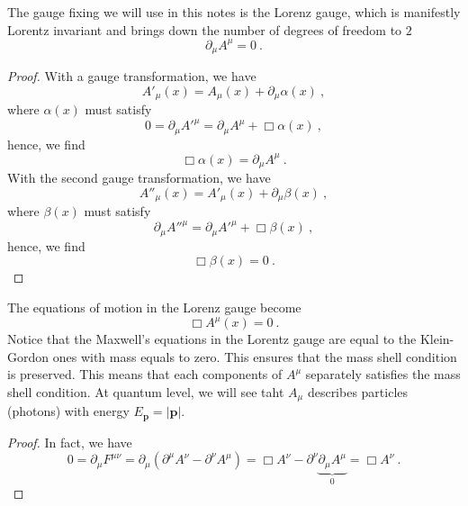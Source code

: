     The gauge fixing we will use in this notes is the Lorenz gauge, which is manifestly Lorentz invariant and brings down the number of degrees of freedom to $2$
    \begin{equation*}
        \partial_\mu A^\mu = 0 ~.
    \end{equation*}
    \begin{proof}
        With a gauge transformation, we have
        \begin{equation*}
            {A'}_\mu (x) = A_\mu (x) + \partial_\mu \alpha (x) ~,
        \end{equation*}
        where $\alpha (x)$ must satisfy 
        \begin{equation*}
            0 = \partial_\mu {A'}^\mu = \partial_\mu A^\mu + \Box \alpha (x) ~,
        \end{equation*}
        hence, we find
        \begin{equation*}
            \Box \alpha(x) = \partial_\mu A^\mu ~.
        \end{equation*}
        With the second gauge transformation, we have
        \begin{equation*}
            {A''}_\mu (x) = {A'}_\mu (x) + \partial_\mu \beta (x) ~,
        \end{equation*}
        where $\beta (x)$ must satisfy 
        \begin{equation*}
            \partial_\mu {A''}^\mu = \partial_\mu {A'}^\mu + \Box \beta (x) ~,
        \end{equation*}
        hence, we find
        \begin{equation*}
            \Box \beta(x) = 0 ~.
        \end{equation*}
    \end{proof}
    The equations of motion in the Lorenz gauge become 
    \begin{equation}\label{lgem}
        \Box A^\mu (x) = 0 ~.
    \end{equation}
    Notice that the Maxwell's equations in the Lorentz gauge are equal to the Klein-Gordon ones with mass equals to zero. This ensures that the mass shell condition is preserved. This means that each components of $A^\mu$ separately satisfies the mass shell condition. At quantum level, we will see taht $A_\mu$ describes particles (photons) with energy $E_{\mathbf p} = |\mathbf p|$.
    \begin{proof}
        In fact, we have
        \begin{equation*}
            0 = \partial_\mu F^{\mu\nu} = \partial_\mu (\partial^\mu A^\nu - \partial^\nu A^\mu) = \Box A^\nu - \partial^\nu \underbrace{\partial_\mu A^\mu}_0 = \Box A^\nu ~.
        \end{equation*}
    \end{proof}

